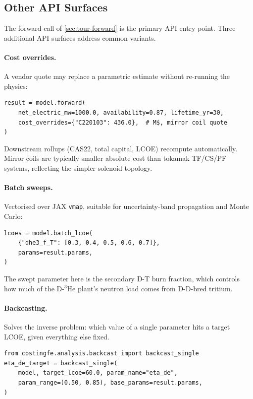 \documentclass{article}
\begin{document}
\subsection{Other API Surfaces}
\label{sec:tour-api}

The forward call of \cref{sec:tour-forward} is the primary API entry
point. Three additional API surfaces address common variants.

\paragraph{Cost overrides.} A vendor quote may replace a parametric
estimate without re-running the physics:

\begin{lstlisting}
result = model.forward(
    net_electric_mw=1000.0, availability=0.87, lifetime_yr=30,
    cost_overrides={"C220103": 436.0},  # M$, mirror coil quote
)
\end{lstlisting}

Downstream rollups (CAS22, total capital, LCOE) recompute
automatically. Mirror coils are typically smaller absolute cost than
tokamak TF/CS/PF systems, reflecting the simpler solenoid topology.

\paragraph{Batch sweeps.} Vectorised over JAX \texttt{vmap},
suitable for uncertainty-band propagation and Monte Carlo:

\begin{lstlisting}
lcoes = model.batch_lcoe(
    {"dhe3_f_T": [0.3, 0.4, 0.5, 0.6, 0.7]},
    params=result.params,
)
\end{lstlisting}

The swept parameter here is the secondary D-T burn fraction, which
controls how much of the D-${}^3$He plant's neutron load comes from
D-D-bred tritium.

\paragraph{Backcasting.} Solves the inverse problem: which value of a
single parameter hits a target LCOE, given everything else fixed.

\begin{lstlisting}
from costingfe.analysis.backcast import backcast_single
eta_de_target = backcast_single(
    model, target_lcoe=60.0, param_name="eta_de",
    param_range=(0.50, 0.85), base_params=result.params,
)
\end{lstlisting}
\end{document}
